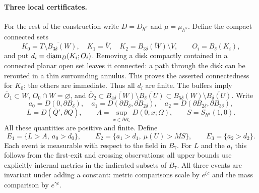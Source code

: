 \documentclass[12pt]{amsart}
\numberwithin{equation}{section}
\begin{document}
\paragraph{Three local certificates.}
For the rest of the construction write $D=D_{h^\alpha}$ and
$\mu=\mu_{h^\alpha}$. Define the compact connected sets
\[
 K_0=\overline{T\setminus B_{3\delta}(W)},\quad
 K_1=\overline V,\quad
 K_2=\overline{B_{3\delta}(W)\setminus V},
 \qquad O_i=B_\delta(K_i),
\]
and put $d_i={\mbox{diam}}_D(K_i;O_i)$.
Removing a disk compactly contained in a connected planar open
set leaves it connected: a path through the disk can be
rerouted in a thin surrounding annulus. This proves the asserted
connectedness for $K_0$; the others are immediate. Thus all
$d_i$ are finite. The buffers imply
$\overline O_1\subset W$, $O_0\cap W=\varnothing$, and
$\overline O_2\subset \overline{B_{4\delta}(W)}\setminus
\overline{B_\delta(U)}\subset B_{5\delta}(W)\setminus\overline{B_\delta(U)}$.
Write
\[
 a_0=D(0,\partial B_\delta),\quad
 a_1=D(\partial B_\delta,\partial B_{2\delta}),\quad
 a_2=D(\partial B_{2\delta},\partial B_{3\delta}),
\]
\[
 L=D(\overline Q',\partial Q),\qquad
 A=\sup_{x\in\partial B_5}D(0,x;\Omega),\qquad
 S=S_{h^\alpha}(1,0).
\]
All these quantities are positive and finite. Define
\begin{equation}\label{s11-pinch:eq:Es}
 E_1=\{L>A,\ a_0>d_0\},\qquad
 E_2=\{a_1>d_1,\ \mu(U)>MS\},\qquad
 E_3=\{a_2>d_2\}.
\end{equation}
Each event is measurable with respect to the field in $B_7$.
For $L$ and the $a_i$ this follows from the first-exit and
crossing observations; all upper bounds use explicitly internal
metrics in the indicated subsets of $B_7$. All three events
are invariant under adding a constant: metric comparisons
scale by $e^{\xi c}$ and the mass comparison by $e^{\gamma c}$.
\end{document}
